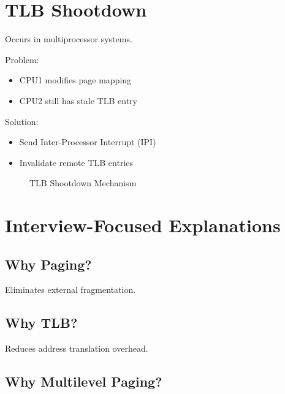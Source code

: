 \section{TLB Shootdown}

Occurs in multiprocessor systems.

Problem:

\begin{itemize}
\item CPU1 modifies page mapping
\item CPU2 still has stale TLB entry
\end{itemize}

Solution:

\begin{itemize}
\item Send Inter-Processor Interrupt (IPI)
\item Invalidate remote TLB entries
\end{itemize}

\begin{figure}[H]
\centering
{}
\caption{TLB Shootdown Mechanism}
\end{figure}

\section{Interview-Focused Explanations}

\subsection{Why Paging?}

Eliminates external fragmentation.

\subsection{Why TLB?}

Reduces address translation overhead.

\subsection{Why Multilevel Paging?}

